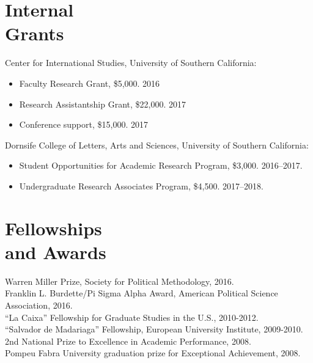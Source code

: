 \documentclass[margin,line,11pt]{resume}
\newcommand{\nl}{\vspace{0.10in}\\}
\begin{document}
\begin{resume}


\newpage

        \section{\mysidestyle Internal\\Grants}

Center for International Studies, University of Southern California:
\begin{itemize}
\item[] Faculty Research Grant, \$5,000. 2016
\vspace{-.15cm}
\item[] Research Assistantship Grant, \$22,000. 2017
\vspace{-.15cm}
\item[] Conference support, \$15,000. 2017
\end{itemize}
Dornsife College of Letters, Arts and Sciences, University of Southern California:
\begin{itemize}
\item[] Student Opportunities for Academic Research Program, \$3,000. 2016--2017.
\vspace{-.15cm}
\item[] Undergraduate Research Associates Program, \$4,500. 2017--2018.
\end{itemize}
 

    \section{\mysidestyle Fellowships\\ and Awards}
	Warren Miller Prize, Society for Political Methodology, 2016.\nl
    Franklin L. Burdette/Pi Sigma Alpha Award, American Political Science Association, 2016.\nl
	``La Caixa'' Fellowship for Graduate Studies in the U.S., 2010-2012. \nl
	``Salvador de Madariaga'' Fellowship, European University Institute, 2009-2010. \nl
	 2nd National Prize to Excellence in Academic Performance, 2008. \nl
	Pompeu Fabra University graduation prize for Exceptional Achievement, 2008.


\end{resume}
\end{document}
